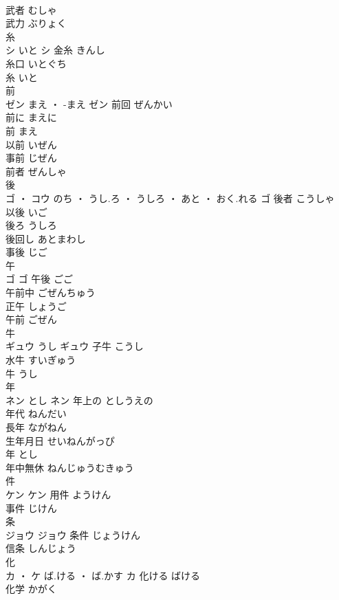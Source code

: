 \documentclass[8pt]{extreport}
\begin{document}
\begin{CJK}{UTF8}{min}
\\	武者	むしゃ	
\\	武力	ぶりょく	
\\	糸	
\\	シ	いと	シ	金糸	きんし	
\\	糸口	いとぐち	
\\	糸	いと	
\\	前	
\\	ゼン	まえ ・ -まえ	ゼン	前回	ぜんかい	
\\	前に	まえに	
\\	前	まえ	
\\	以前	いぜん	
\\	事前	じぜん	
\\	前者	ぜんしゃ	
\\	後	
\\	ゴ ・ コウ	のち ・ うし.ろ ・ うしろ ・ あと ・ おく.れる	ゴ	後者	こうしゃ	
\\	以後	いご	
\\	後ろ	うしろ	
\\	後回し	あとまわし	
\\	事後	じご	
\\	午	
\\	ゴ		ゴ													午後	ごご	
\\	午前中	ごぜんちゅう	
\\	正午	しょうご	
\\	午前	ごぜん	
\\	牛	
\\	ギュウ	うし	ギュウ	子牛	こうし	
\\	水牛	すいぎゅう	
\\	牛	うし	
\\	年	
\\	ネン	とし	ネン	年上の	としうえの	
\\	年代	ねんだい	
\\	長年	ながねん	
\\	生年月日	せいねんがっぴ	
\\	年	とし	
\\	年中無休	ねんじゅうむきゅう	
\\	件	
\\	ケン		ケン	用件	ようけん	
\\	事件	じけん	
\\	条	
\\	ジョウ		ジョウ	条件	じょうけん	
\\	信条	しんじょう	
\\	化	
\\	カ ・ ケ	ば.ける ・ ば.かす	カ	化ける	ばける	
\\	化学	かがく	

\end{CJK}
\end{document}
